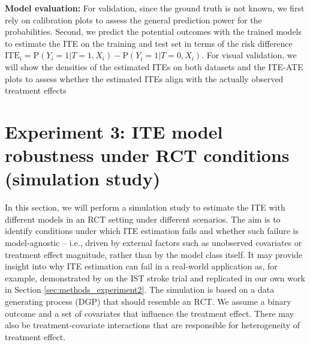 \textbf{Model evaluation: } For validation, since the ground truth is not known, we first rely on calibration plots to assess the general prediction power for the probabilities. Second, we predict the potential outcomes with the trained models to estimate the ITE on the training and test set in terms of the risk difference $\text{ITE}_i = \text{P}(Y_i=1|T=1, X_i) - \text{P}(Y_i=1|T=0, X_i)$. For visual validation, we will show the densities of the estimated ITEs on both datasets and the ITE-ATE plots to assess whether the estimated ITEs align with the actually observed treatment effects









\section{Experiment 3: ITE model robustness under RCT conditions (simulation study)} \label{sec:methods_experiment3}

In this section, we will perform a simulation study to estimate the ITE with different models in an RCT setting under different scenarios. The aim is to identify conditions under which ITE estimation fails and whether such failure is model-agnostic -- i.e., driven by external factors such as unobserved covariates or treatment effect magnitude, rather than by the model class itself. It may provide insight into why ITE estimation can fail in a real-world application as, for example, demonstrated by \citet{chen2025} on the IST stroke trial and replicated in our own work in Section \ref{sec:methods_experiment2}. The simulation is based on a data generating process (DGP) that should resemble an RCT. We assume a binary outcome and a set of covariates that influence the treatment effect. There may also be treatment-covariate interactions that are responsible for heterogeneity of treatment effect. 


